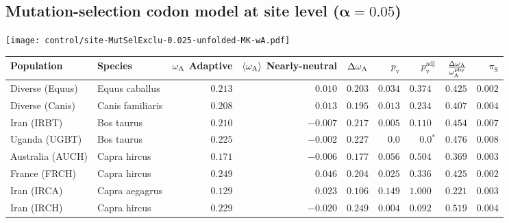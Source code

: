 \subsection{Mutation-selection codon model at site level ($\bm{\alpha=0.05}$)}
\begin{center}
    \texttt{[image: control/site-MutSelExclu-0.025-unfolded-MK-wA.pdf]}
    \begin{adjustbox}{width = 1\textwidth}
        \begin{tabular}{|l|l|r|r|r|r|r|r|r|}
            \toprule
            Population & Species & \specialcell{$\omega_{\mathrm{A}}$ \\ Adaptive}                & \specialcell{$\left< \omega_{\mathrm{A}} \right>$ \\ Nearly-neutral}                & $\Delta \omega_{\mathrm{A}} $    & $p_{\mathrm{v}}$ & $p_{\mathrm{v}}^{\mathrm{adj}}$  & $\frac{\Delta\omega_{\mathrm{A}}}{\omega_{\mathrm{A}}^{\mathrm{phy}}}$ & $\pi_{\textrm{S}}$ \\
            \midrule
            Diverse (Equus)                    & Equus caballus          & $ 0.213$ & $ 0.010$  & $ 0.203$ & $ 0.034$ & $ 0.374~~$        & $ 0.425$ & $ 0.002$ \\
            Diverse (Canis)                  & Canis familiaris          & $ 0.208$ & $ 0.013$  & $ 0.195$ & $ 0.013$    & $ 0.234~~$    & $ 0.407$ & $ 0.004$ \\
            Iran (IRBT)               & Bos taurus        & $ 0.210$ & $-0.007$  & $ 0.217$ & $ 0.005$ & $ 0.110~~$        & $ 0.454$ & $ 0.007$ \\
            Uganda (UGBT)                  & Bos taurus        & $ 0.225$ & $-0.002$  & $ 0.227$ & $0.0$ & $\bm{0.0{^*}}$        & $ 0.476$ & $ 0.008$ \\
            Australia (AUCH)                    & Capra hircus      & $ 0.171$ & $-0.006$  & $ 0.177$ & $ 0.056$ & $ 0.504~~$        & $ 0.369$ & $ 0.003$ \\
            France (FRCH)                    & Capra hircus        & $ 0.249$ & $ 0.046$  & $ 0.204$ & $ 0.025$ & $ 0.336~~$        & $ 0.425$ & $ 0.002$ \\
            Iran (IRCA)                   & Capra aegagrus        & $ 0.129$ & $ 0.023$  & $ 0.106$ & $ 0.149$ & $ 1.000~~$        & $ 0.221$ & $ 0.003$ \\
            Iran (IRCH)                 & Capra hircus        & $ 0.229$ & $-0.020$  & $ 0.249$ & $ 0.004$ & $ 0.092~~$        & $ 0.519$ & $ 0.004$ \\

\end{tabular}
\end{adjustbox}
\end{center}
